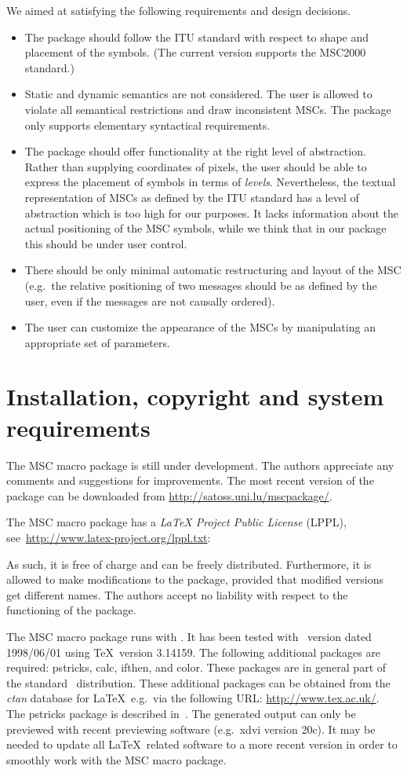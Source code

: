 \documentclass[12pt,a4paper]{article}
\newcommand{\acro}[1]{{#1}}
\newcommand{\MSC}{\acro{MSC}}
\newcommand{\mscpack}{\MSC{} macro package}
\begin{document}
We aimed at satisfying the following requirements and design
decisions.
\begin{itemize}
\item
The package should follow the ITU standard with respect to shape and
placement of the symbols. (The current version supports
the \MSC2000 standard.) 
\item
Static and dynamic semantics are not considered. The user is allowed
to violate all semantical restrictions and draw inconsistent \MSC{}s.
The package only supports elementary syntactical requirements.
\item
The package should offer functionality at the right level of
abstraction. Rather than supplying coordinates of pixels, the
user should be able to express the placement of symbols in terms of
{\em levels}.
Nevertheless, the textual representation of \MSC{}s as defined by the ITU
standard has a level of abstraction which is too high for our purposes.
It lacks information about the actual positioning of the \MSC{} symbols,
while we think that in our package this should be under user control.
\item
There should be only minimal automatic restructuring and layout of the
\MSC{} (e.g.\ the relative positioning of two messages should be as
defined by the user, even if the messages are not causally ordered).
\item
The user can customize the appearance of the \MSC{}s by manipulating
an appropriate set of parameters.
\end{itemize}

\section{Installation, copyright and system requirements}
\label{install}

The \mscpack{} is still under development. The authors
appreciate any comments and suggestions for improvements. The most
recent version of the package can be downloaded from
\url{http://satoss.uni.lu/mscpackage/}.


The \mscpack{} has a \emph{LaTeX Project Public License}
(LPPL), see~\url{http://www.latex-project.org/lppl.txt}:
{\small

} As such, it is free of charge and can be freely
distributed. Furthermore, it is allowed to make modifications to the
package, provided that modified versions get different names.  The
authors accept no liability with respect to the functioning of the
package.

The \mscpack{} runs with \LaTeXe. It has been tested with \LaTeXe\
version dated 1998/06/01 using \TeX\ version 3.14159.  The following
additional packages are required: \textsf{pstricks}, \textsf{calc},
\textsf{ifthen}, and \textsf{color}.  These packages are in general
part of the standard \LaTeXe\ distribution. These additional packages
can be obtained from the {\em ctan} database for \LaTeX\, e.g.\ via
the following URL: \url{http://www.tex.ac.uk/}. The \textsf{pstricks}
package is described in~\cite[Chapter~4]{GSM97}.  The generated output
can only be previewed with recent previewing software (e.g.\ xdvi
version 20c).  It may be needed to update all \LaTeX\ related software
to a more recent version in order to smoothly work with the \mscpack.
\end{document}
